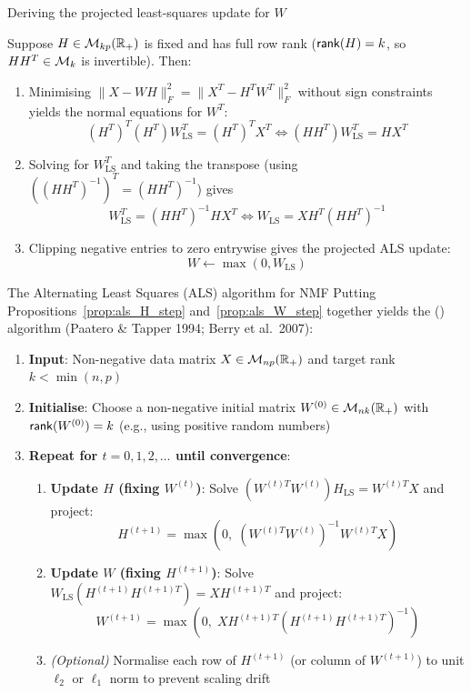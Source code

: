 \documentclass[aspectratio=169]{beamer}\usepackage[]{graphicx}\usepackage[]{xcolor}
\begin{document}
\begin{frame}{Deriving the projected least-squares update for $W$}
\begin{proposition}\label{prop:als_W_step}
Suppose $H \in \mathcal{M}_{kp}(\mathbb{R}_+)$ is fixed and has full row rank ($\mathsf{rank}(H) = k$, so $H H^T \in \mathcal{M}_k$ is invertible). Then:
\begin{enumerate}
\item Minimising $\|X - W H\|_F^2 = \|X^T - H^T W^T\|_F^2$ without sign constraints yields the normal equations for $W^T$:
\[
(H^T)^T (H^T) W_{\text{LS}}^T = (H^T)^T X^T \iff (H H^T) W_{\text{LS}}^T = H X^T
\]
\item Solving for $W_{\text{LS}}^T$ and taking the transpose (using $((H H^T)^{-1})^T = (H H^T)^{-1}$) gives
\[
W_{\text{LS}}^T = (H H^T)^{-1} H X^T \iff W_{\text{LS}} = X H^T (H H^T)^{-1}
\]
\item Clipping negative entries to zero entrywise gives the projected ALS update:
\[
W \leftarrow \max(0, W_{\text{LS}})
\]
\end{enumerate}
\end{proposition}
\end{frame}


\begin{frame}{The Alternating Least Squares (ALS) algorithm for NMF}
Putting Propositions~\ref{prop:als_H_step} and~\ref{prop:als_W_step} together yields the  () algorithm (Paatero \& Tapper 1994; Berry et al.\ 2007):
\vfill
\begin{enumerate}
\item \textbf{Input}: Non-negative data matrix $X \in \mathcal{M}_{np}(\mathbb{R}_+)$ and target rank $k < \min(n, p)$
\item \textbf{Initialise}: Choose a non-negative initial matrix $W^{(0)} \in \mathcal{M}_{nk}(\mathbb{R}_+)$ with $\mathsf{rank}(W^{(0)}) = k$ (e.g., using positive random numbers)
\item \textbf{Repeat for $t = 0, 1, 2, \ldots$ until convergence}:
\begin{enumerate}
\item \textbf{Update $H$ (fixing $W^{(t)}$)}: Solve $(W^{(t)T} W^{(t)}) H_{\text{LS}} = W^{(t)T} X$ and project:
\[
H^{(t+1)} = \max\!\left(0,\; (W^{(t)T} W^{(t)})^{-1} W^{(t)T} X\right)
\]
\item \textbf{Update $W$ (fixing $H^{(t+1)}$)}: Solve $W_{\text{LS}} (H^{(t+1)} H^{(t+1)T}) = X H^{(t+1)T}$ and project:
\[
W^{(t+1)} = \max\!\left(0,\; X H^{(t+1)T} (H^{(t+1)} H^{(t+1)T})^{-1}\right)
\]
\item \emph{(Optional)} Normalise each row of $H^{(t+1)}$ (or column of $W^{(t+1)}$) to unit $\ell_2$ or $\ell_1$ norm to prevent scaling drift
\end{enumerate}
\end{enumerate}
\end{frame}
\end{document}

